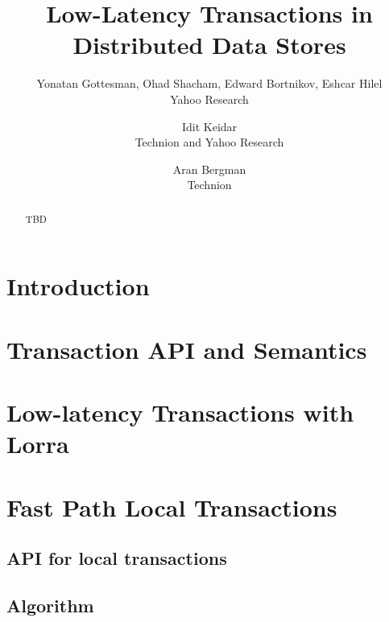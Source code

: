 \documentclass[letterpaper,twocolumn,10pt]{article}
\newcommand{\sys}{Lorra}
\begin{document}
\date{}

\title{\Large \bf Low-Latency Transactions in Distributed Data Stores}

\author{
{\rm Yonatan Gottesman, Ohad Shacham,  Edward Bortnikov, Eshcar Hilel}\\
	Yahoo Research
\and 
{\rm Idit Keidar}\\
	Technion and Yahoo Research
\and 
{\rm  Aran Bergman}\\
 	{Technion}
} %


\maketitle




\begin{abstract}
TBD
\end{abstract}


\section{Introduction} \label{sec:intro}
%
 

\section{Transaction API and Semantics} \label{sec:api}



\section{Low-latency Transactions with \sys} \label{sec:ll}



\section{Fast Path Local Transactions}
\label{sec:alg}
\subsection{API for local transactions}

\subsection{Algorithm}

\end{document}
